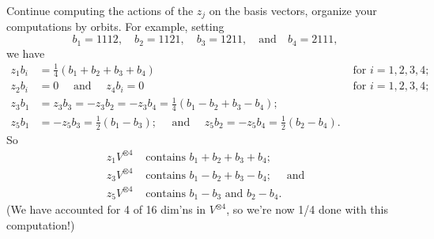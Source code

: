 \documentclass[11pt, reqno]{amsart}
\theoremstyle{plain}
\theoremstyle{definition}
\theoremstyle{example}
\begin{document}
Continue computing the actions of the $z_j$ on the basis vectors, organize your computations by orbits. 
For example, setting 
$$b_1 = 1112, \quad b_2 = 1121, \quad b_3 = 1211, \quad \text{and} \quad  b_4 = 2111,$$
we have 
\begin{align*}
z_1 b_i &= \frac{1}{4}(b_1 + b_2 + b_3 + b_4) & \text{ for }i=1,2,3,4;\\
z_2 b_i &= 0 \quad \text{ and } \quad z_4 b_i = 0& \text{ for }i=1,2,3,4;\\
z_3 b_1& = z_3 b_3 = -z_3 b_2 = -z_3 b_4 = \frac{1}{4}(b_1 - b_2 + b_3 - b_4); &\\
z_5 b_1& = -z_5 b_3 = \frac{1}{2}(b_1 - b_3); \quad \text{ and } \quad
z_5 b_2 = -z_5 b_4 = \frac{1}{2}(b_2 - b_4).
\end{align*}
So 
\begin{align*}
z_1V^{\otimes 4} & \text{ contains } b_1 + b_2 + b_3 + b_4;\\
z_3V^{\otimes 4} & \text{ contains } b_1 - b_2 + b_3 - b_4; \quad \text{ and}\\
z_5V^{\otimes 4}  & \text{ contains } b_1 - b_3 \text{ and } b_2 - b_4.
\end{align*} 
(We have accounted for 4 of 16 dim'ns in $V^{\otimes 4}$, so we're now 1/4 done with this computation!)
\end{document}
